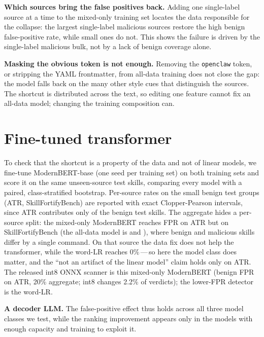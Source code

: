 \MechanismSentence{}

\textbf{Which sources bring the false positives back.} Adding one single-label source at a time to
the mixed-only training set locates the data responsible for the collapse: the largest single-label
malicious sources restore the high benign false-positive rate, while small ones do not. This shows
the failure is driven by the single-label malicious bulk, not by a lack of benign coverage alone.

\textbf{Masking the obvious token is not enough.} Removing the \texttt{openclaw} token, or stripping
the YAML frontmatter, from all-data training does not close the gap: the model falls back on the many
other style cues that distinguish the sources. The shortcut is distributed across the text, so
editing one feature cannot fix an all-data model; changing the training composition can.

\section{Fine-tuned transformer}
\label{sec:transformer}
To check that the shortcut is a property of the data and not of linear models, we fine-tune
ModernBERT-base (one seed per training set) on both training sets and score it on the same
unseen-source test skills, comparing every model with a paired, class-stratified bootstrap.
\TransformerSentence{} Per-source rates on the small benign test groups (ATR, SkillFortifyBench) are
reported with exact Clopper-Pearson intervals, since ATR contributes only \TestAtrBenign{} of the
\TestBenign{} benign test skills. The aggregate hides a per-source split: the mixed-only ModernBERT
reaches \MbAtrMixed{} FPR on ATR but \MbSfbMixed{} on SkillFortifyBench (the all-data model is
\MbAtrAll{} and \MbSfbAll{}), where benign and malicious skills differ by a single command. On that
source the data fix does not help the transformer, while the word-LR reaches 0\%\,---\,so here the
model class does matter, and the ``not an artifact of the linear model'' claim holds only on ATR. The
released int8 ONNX scanner is this mixed-only ModernBERT (benign FPR \MbAtrMixed{} on ATR, 20\%
aggregate; int8 changes 2.2\% of verdicts); the lower-FPR detector is the word-LR.

\textbf{A decoder LLM.} \DecoderSentence{} The false-positive effect thus holds across all three model
classes we test, while the ranking improvement appears only in the models with enough capacity and
training to exploit it.

